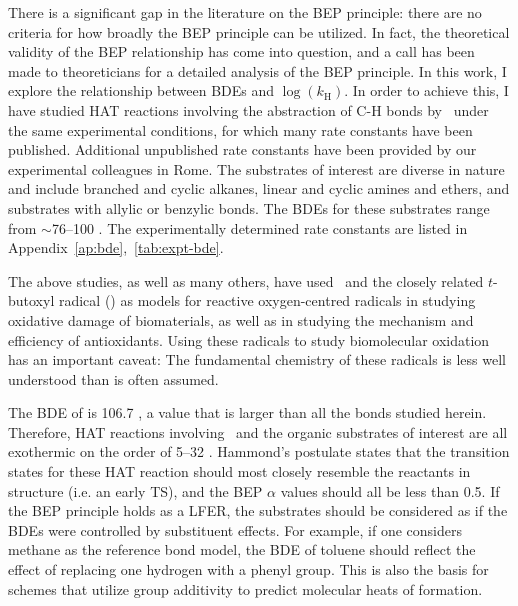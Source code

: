 There is a significant gap in the literature on the BEP principle: there are no
criteria for how broadly the BEP principle can be utilized. In fact, the
theoretical validity of the BEP relationship has come into question, and a call
has been made to theoreticians for a detailed analysis of the BEP
principle.\cite{vanSanten2010} In this work, I explore the relationship between
BDEs and $\log(k_\mathrm{H})$. In order to achieve this, I have studied HAT
reactions involving the abstraction of C-H bonds by \cumo\ under the same
experimental conditions, for which many rate constants have been
published.\cite{Bietti2010, Bietti2011, Pischel2001, Salamone2011, Salamone2012,
Salamone2012a, Salamone2013, Salamone2015} Additional unpublished rate constants
have been provided by our experimental colleagues in Rome. The substrates of
interest are diverse in nature and include branched and cyclic alkanes, linear
and cyclic amines and ethers, and substrates with allylic or benzylic 
bonds. The BDEs for these substrates range from $\sim$76--100 \kcalmol. The
experimentally determined rate constants are listed in
Appendix~\ref{ap:bde},~\ref{tab:expt-bde}.

The above studies, as well as many others, have used \cumo\ and the closely
related $t$-butoxyl radical () as models for reactive
oxygen-centred radicals in studying oxidative damage of
biomaterials,\cite{Adam1998, Adam2002, Jones2003} as well as in studying the
mechanism and efficiency of antioxidants.\cite{MacFaul1996, Valgimigli1996,
Valgimigli1999, Jovanovic1999, Sortino2003} Using these radicals to study
biomolecular oxidation has an important caveat: The fundamental chemistry of
these radicals is less well understood than is often assumed. \cite{Tanko2001,
Finn2004, Salamone2011b}

The BDE of  is 106.7 \kcalmol, a value that is larger than all the
 bonds studied herein. Therefore, HAT reactions involving \cumo\ and the organic substrates
of interest are all exothermic on the order of 5--32 \kcalmol. Hammond's
postulate\cite{Hammond1955} states that the transition states for these HAT
reaction should most closely resemble the reactants in structure (i.e.  an
early TS), and the BEP $\alpha$ values should all be less than
0.5.\cite{Russell1973} If the BEP principle holds as a LFER, the substrates
should be considered as if the BDEs were controlled by substituent effects. For
example, if one considers methane as the reference  bond model, the BDE
of toluene should reflect the effect of replacing one hydrogen with a phenyl
group. This is also the basis for schemes that utilize group additivity to
predict molecular heats of formation.\cite{Benson1976}

